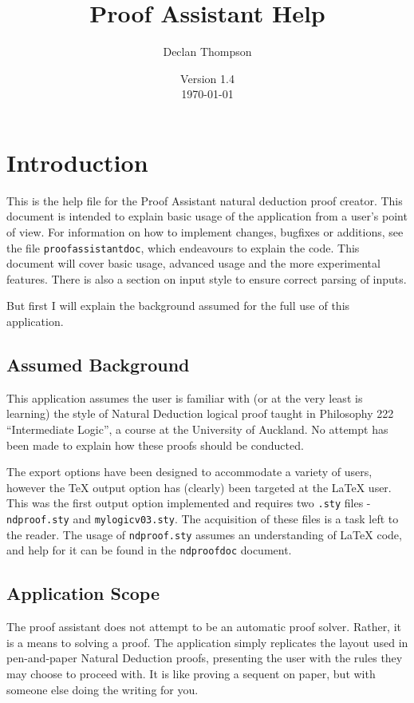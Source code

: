 \documentclass[a4paper]{article}
\title{Proof Assistant Help}
\author{Declan Thompson}
\date{Version 1.4\\
			\today}
\begin{document}
\maketitle

\tableofcontents

\section{Introduction}
This is the help file for the Proof Assistant natural deduction proof creator. This document is intended to explain basic usage of the application from a user's point of view. For information on how to implement changes, bugfixes or additions, see the file \texttt{proofassistantdoc}, which endeavours to explain the code. This document will cover basic usage, advanced usage and the more experimental features. There is also a section on input style to ensure correct parsing of inputs.

But first I will explain the background assumed for the full use of this application.

\subsection{Assumed Background}
This application assumes the user is familiar with (or at the very least is learning) the style of Natural Deduction logical proof taught in Philosophy 222 ``Intermediate Logic'', a course at the University of Auckland. No attempt has been made to explain how these proofs should be conducted.

The export options have been designed to accommodate a variety of users, however the {\TeX} output option has (clearly) been targeted at the {\LaTeX} user. This was the first output option implemented and requires two \texttt{.sty} files - \texttt{ndproof.sty} and \texttt{mylogicv03.sty}. The acquisition of these files is a task left to the reader. The usage of \texttt{ndproof.sty} assumes an understanding of {\LaTeX} code, and help for it can be found in the \texttt{ndproofdoc} document.

\subsection{Application Scope}
The proof assistant does not attempt to be an automatic proof solver. Rather, it is a means to solving a proof. The application simply replicates the layout used in pen-and-paper Natural Deduction proofs, presenting the user with the rules they may choose to proceed with. It is like proving a sequent on paper, but with someone else doing the writing for you.
\end{document}
